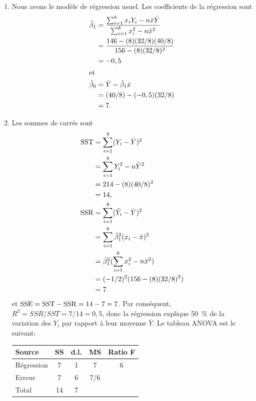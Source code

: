 \begin{solution}{2.2}
    \begin{enumerate}
    \item Nous avons le modèle de régression usuel. Les coefficients
      de la régression sont
      \begin{align*}
        \hat{\beta}_1
        &=\frac{\sum_{i=1}^8 x_iY_i-n\bar{x}\bar{Y}}{\sum_{i=1}^8
          x_i^2-n\bar{x}^2} \\
        &=\frac{146-(8)(32/8)(40/8)}{156-(8)(32/8)^2}  \\
        &=-0,5 \\
        \intertext{et}
        \hat{\beta}_0
        &=\bar{Y}-\hat{\beta}_1\bar{x} \\
        &=(40/8)-(-0,5)(32/8) \\
        &=7.
      \end{align*}
    \item Les sommes de carrés sont
      \begin{align*}
        \mathrm{SST}
        &=\sum_{i=1}^8(Y_i-\bar{Y})^2 \\
        &=\sum_{i=1}^8Y_i^2-n\bar{Y}^2 \\
        &=214-(8)(40/8)^2 \\
        &=14, \\
        \mathrm{SSR}
        &=\sum_{i=1}^8(\hat{Y}_i-\bar{Y})^2 \\
        &=\sum_{i=1}^8\hat{\beta}_1^2(x_i-\bar{x})^2 \\
        &=\hat{\beta}_1^2(\sum_{i=1}^8x_i^2-n\bar{x}^2) \\
        &=(-1/2)^2(156-(8)(32/8)^2) \\
        &=7.
      \end{align*}
      et $\mathrm{SSE} = \mathrm{SST} - \mathrm{SSR} = 14 - 7 = 7$. Par conséquent, $R^2 =
      SSR/SST = 7/14 = 0,5$, donc la régression explique 50~\% de la
      variation des $Y_i$ par rapport à leur moyenne $\bar{Y}$. Le
      tableau ANOVA est le suivant:
      \begin{center}
        \begin{tabular}{lcccc}
          \toprule
          Source & SS & d.l. & MS & Ratio F \\
          \midrule
          Régression & 7 & 1 & 7   & 6 \\
          Erreur     & 7 & 6 & 7/6 &  \\
          \midrule
          Total & 14 & 7 & & \\
          \bottomrule
        \end{tabular}
      \end{center}
    \end{enumerate}
  
\end{solution}
